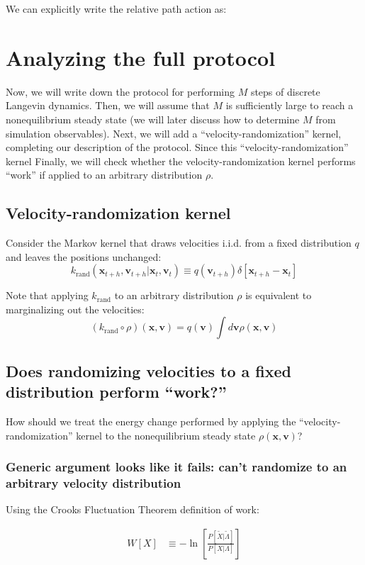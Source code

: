 \documentclass[11pt]{article}
\newcommand{\x}{\mathbf{x}}
\newcommand{\vel}{\mathbf{v}}
\begin{document}
We can explicitly write the relative path action as: %

\section{Analyzing the full protocol}
Now, we will write down the protocol for performing $M$ steps of discrete Langevin dynamics.
Then, we will assume that $M$ is sufficiently large to reach a nonequilibrium steady state (we will later discuss how to determine $M$ from simulation observables).
Next, we will add a ``velocity-randomization'' kernel, completing our description of the protocol.
Since this ``velocity-randomization'' kernel 
Finally, we will check whether the velocity-randomization kernel performs ``work'' if applied to an arbitrary distribution $\rho$.

\subsection{Velocity-randomization kernel}
Consider the Markov kernel that draws velocities i.i.d. from a fixed distribution $q$ and leaves the positions unchanged:
$$k_\text{rand} (\x_{t+h}, \vel_{t+h} | \x_{t}, \vel_{t}) \equiv q(\vel_{t+h}) \delta[\x_{t+h} - \x_{t}]$$

Note that applying $k_\text{rand}$ to an arbitrary distribution $\rho$ is equivalent to marginalizing out the velocities:
$$ (k_\text{rand} \circ \rho)(\x, \vel) = q(\vel) \int d \vel \rho(\x, \vel)$$

\subsection{Does randomizing velocities to a fixed distribution perform ``work?''}
How should we treat the energy change performed by applying the ``velocity-randomization'' kernel to the nonequilibrium steady state $\rho(\x, \vel)$?

\subsubsection{Generic argument looks like it fails: can't randomize to an arbitrary velocity distribution}
Using the Crooks Fluctuation Theorem definition of work:

$$\begin{aligned}
W[X] &\equiv -\ln \left[ \frac{P[\tilde{X} | \tilde{\Lambda}]}{P[X | \Lambda]} \right]\\
\end{aligned}$$
\end{document}

